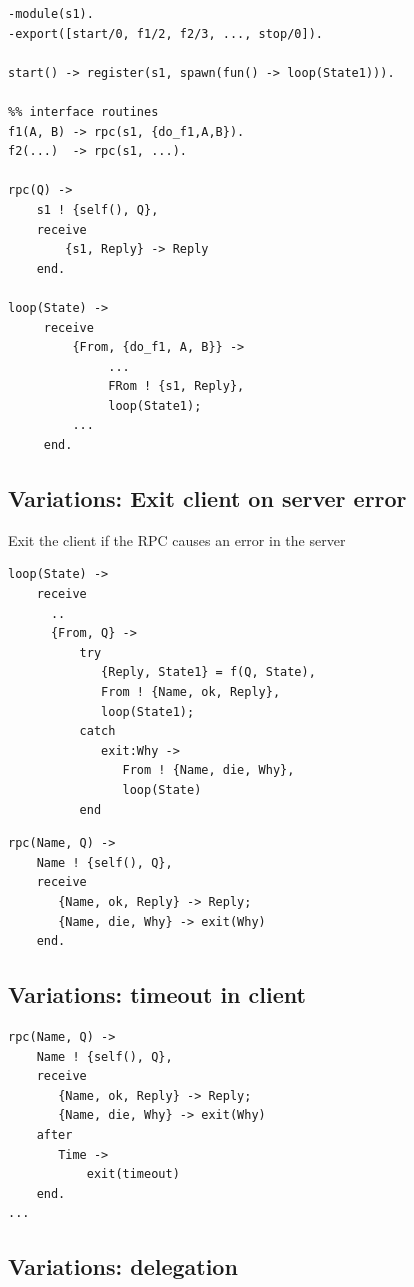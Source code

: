 \documentclass[12pt]{article}
\begin{document}
\begin{itemize}
\begin{verbatim}
-module(s1).
-export([start/0, f1/2, f2/3, ..., stop/0]).

start() -> register(s1, spawn(fun() -> loop(State1))).

%% interface routines
f1(A, B) -> rpc(s1, {do_f1,A,B}).
f2(...)  -> rpc(s1, ...).

rpc(Q) ->
    s1 ! {self(), Q},
    receive
        {s1, Reply} -> Reply
    end.
    
loop(State) ->
     receive
         {From, {do_f1, A, B}} ->
              ...
              FRom ! {s1, Reply},
              loop(State1);
         ...
     end.
\end{verbatim}

\subsection{Variations: Exit client on server error}

Exit the client if the RPC causes an error in the server

\begin{verbatim}
loop(State) ->
    receive
      ..
      {From, Q} ->    
          try  
             {Reply, State1} = f(Q, State),
             From ! {Name, ok, Reply},
             loop(State1);
          catch 
             exit:Why ->
                From ! {Name, die, Why},
                loop(State)
          end
\end{verbatim}

\begin{verbatim}
rpc(Name, Q) ->
    Name ! {self(), Q},
    receive
       {Name, ok, Reply} -> Reply;
       {Name, die, Why} -> exit(Why)
    end.
\end{verbatim}

\subsection{Variations:  timeout in client}

\begin{verbatim}
rpc(Name, Q) ->
    Name ! {self(), Q},
    receive
       {Name, ok, Reply} -> Reply;
       {Name, die, Why} -> exit(Why)
    after
       Time ->
           exit(timeout)
    end.
...
\end{verbatim}

\subsection{Variations:  delegation}


\end{itemize}
\end{document}
